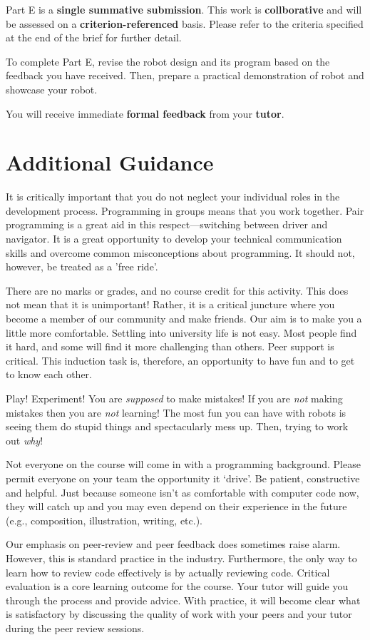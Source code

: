 \documentclass{fal_assignment}
\begin{document}
Part E is a \textbf{single summative submission}. This work is \textbf{collborative} and will be assessed on a \textbf{criterion-referenced} basis.  Please refer to the criteria specified at the end of the brief for further detail.

To complete Part E, revise the robot design and its program based on the feedback you have received. Then, prepare a practical demonstration of robot and showcase your robot.

You will receive immediate \textbf{formal feedback} from your \textbf{tutor}.

\section*{Additional Guidance}

It is critically important that you do not neglect your individual roles in the development process. Programming in groups means that you work together. Pair programming is a great aid in this respect---switching between driver and navigator. It is a great opportunity to develop your technical communication skills and overcome common misconceptions about programming. It should not, however, be treated as a 'free ride'. 

There are no marks or grades, and no course credit for this activity. This does not mean that it is unimportant! Rather, it is a critical juncture where you become a member of our community and make friends. Our aim is to make you a little more comfortable. Settling into university life is not easy. Most people find it hard, and some will find it more challenging than others. Peer support is critical. This induction task is, therefore, an opportunity to have fun and to get to know each other. 

Play! Experiment! You are \textit{supposed} to make mistakes! If you are \textit{not} making mistakes then you are \textit{not} learning! The most fun you can have with robots is seeing them do stupid things and spectacularly mess up. Then, trying to work out \textit{why}!

Not everyone on the course will come in with a programming background. Please permit everyone on your team the opportunity it `drive'. Be patient, constructive and helpful. Just because someone isn't as comfortable with computer code now, they will catch up and you may even depend on their experience in the future (e.g., composition, illustration, writing, etc.).

Our emphasis on peer-review and peer feedback does sometimes raise alarm. However, this is standard practice in the industry. Furthermore, the only way to learn how to review code effectively is by actually reviewing code. Critical evaluation is a core learning outcome for the course. Your tutor will guide you through the process and provide advice. With practice, it will become clear what is satisfactory by discussing the quality of work with your peers and your tutor during the peer review sessions. 
\end{document}
